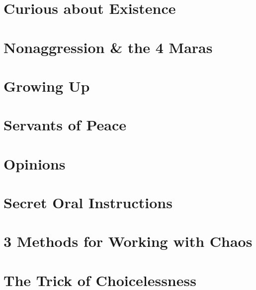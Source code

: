 \documentclass[oneside]{book}
\numberwithin{equation}{section}
\begin{document}
\section{Curious about Existence}


\section{Nonaggression \& the 4 Maras}


\section{Growing Up}


\section{Servants of Peace}


\section{Opinions}


\section{Secret Oral Instructions}


\section{3 Methods for Working with Chaos}


\section{The Trick of Choicelessness}
\end{document}
